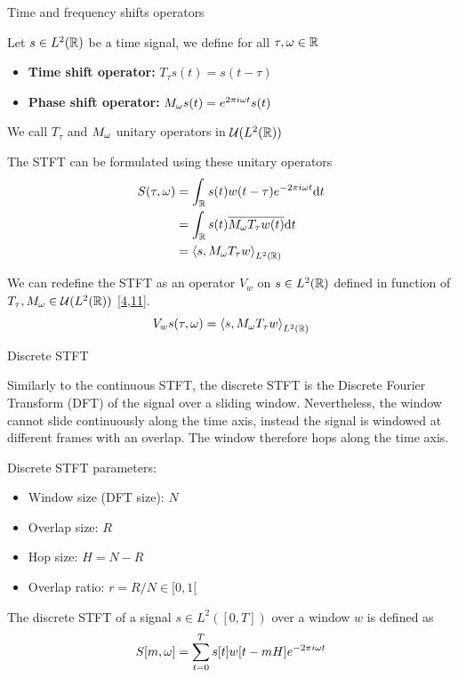 \documentclass[10pt,american,ignorenonframetext,aspectratio=1610]{beamer}
\providecommand{\tightlist}{%
  \setlength{\itemsep}{0pt}\setlength{\parskip}{0pt}}
\theoremstyle{remark}
\begin{document}
\begin{frame}{Time and frequency shifts operators}
\protect\hypertarget{time-and-frequency-shifts-operators}{}

\begin{definition}
Let $s\in L^2(\mathbb{R})$ be a time signal, we define for all $\tau,\omega\in\mathbb{R}$
\begin{itemize}
  \item \textbf{Time shift operator:}  $T_\tau s(t)=s(t-\tau)$
  \item \textbf{Phase shift operator:} $M_\omega s(t)=e^{2\pi i \omega t} s(t)$
\end{itemize}
We call $T_\tau$ and $M_\omega$ unitary operators in $\mathcal{U}(L^2(\mathbb{R}))$
\end{definition}

The STFT can be formulated using these unitary operators \begin{align*}
S(\tau,\omega) &= \int_{\mathbb{R}} s(t)w(t-\tau)e^{-2\pi i\omega t} \mathrm{d}t\\
    &= \int_{\mathbb{R}} s(t) \overline{M_\omega T_\tau w(t)} \mathrm{d}t\\
    &= \left\langle s, M_\omega T_\tau w\right\rangle_{L^2(\mathbb{R})}
\end{align*}

We can redefine the STFT as an operator \(V_w\) on \(s\in L^2(\mathbb{R})\)
defined in function of \(T_\tau,M_\omega\in\mathcal{U}(L^2(\mathbb{R}))\)
{[}\protect\hyperlink{ref-boscain2021}{4},\protect\hyperlink{ref-grochenig2001}{11}{]}.
\[V_w s(\tau,\omega) = \left\langle s, M_\omega T_\tau w\right\rangle_{L^2(\mathbb{R})}\]

\end{frame}

\begin{frame}{Discrete STFT}
\protect\hypertarget{discrete-stft}{}

Similarly to the continuous STFT, the discrete STFT is the Discrete
Fourier Transform (DFT) of the signal over a sliding window.
Nevertheless, the window cannot slide continuously along the time axis,
instead the signal is windowed at different frames with an overlap. The
window therefore hops along the time axis.

Discrete STFT parameters:

\begin{itemize}
\tightlist
\item
  Window size (DFT size): \(N\)
\item
  Overlap size: \(R\)
\item
  Hop size: \(H=N-R\)
\item
  Overlap ratio: \(r=R/N\in[0,1[\)
\end{itemize}

\begin{definition}
The discrete STFT of a signal $s\in L^2([0,T])$ over a window $w$ is defined as
$$S[m,\omega] = \sum_{t=0}^{T} s[t]w[t-mH]e^{-2\pi i\omega t}$$
\end{definition}

\end{frame}
\end{document}
